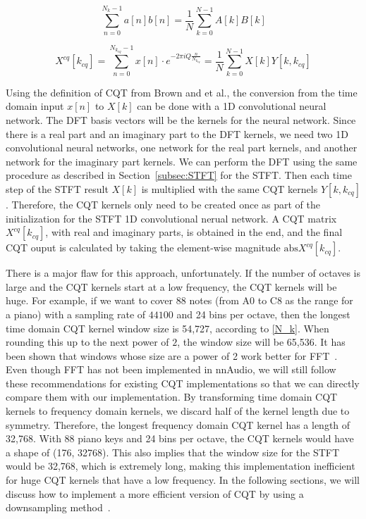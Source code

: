 \documentclass{ieeeaccess}
\begin{document}
\begin{equation}
    \sum_{n=0}^{N_k-1}a[n]b[n] = \frac{1}{N}\sum_{k=0}^{N-1}A[k]B[k]
    \label{Parseval}
\end{equation}

\begin{equation}
    X^{cq}[k_{cq}]= \sum_{n=0}^{N_{k_{cq}}-1}x[n]\cdot e^{-2\pi i Q \frac{n}{N_{k_{cq}}}} = \frac{1}{N}\sum_{k=0}^{N-1}X[k]Y[k, k_{cq}]
    \label{CQT1992}
\end{equation}




Using the definition of CQT from Brown and et al., the conversion from the time domain input $x[n]$ to $X[k]$ can be done with a 1D convolutional neural network. The DFT basis vectors will be the kernels for the neural network. Since there is a real part and an imaginary part to the DFT kernels, we need two 1D convolutional neural networks, one network for the real part kernels, and another network for the imaginary part kernels. We can perform the DFT using the same procedure as described in Section~\ref{subsec:STFT} for the STFT. Then each time step of the STFT result $X[k]$ is multiplied with the same CQT kernels $Y[k, k_{cq}]$. Therefore, the CQT kernels only need to be created once as part of the initialization for the STFT 1D convolutional nerual network. A CQT matrix $X^{cq}[k_{cq}]$, with real and imaginary parts, is obtained in the end, and the final CQT ouput is calculated by taking the element-wise magnitude $\text{abs}{X^{cq}[k_{cq}]}$.


There is a major flaw for this approach, unfortunately. If the number of octaves is large and the CQT kernels start at a low frequency, the CQT kernels will be huge. For example, if we want to cover 88 notes (from A0 to C8 as the range for a piano) with a sampling rate of $44100$ and 24 bins per octave, then the longest time domain CQT kernel window size is 54,727, according to \eqref{N_k}. When rounding this up to the next power of $2$, the window size will be 65,536. It has been shown that windows whose size are a power of 2 work better for FFT~\cite{rabiner1969chirp}.  Even though FFT has not been implemented in nnAudio, we will still follow these recommendations for existing CQT implementations so that we can directly compare them with our implementation. By transforming time domain CQT kernels to frequency domain kernels, we discard half of the kernel length due to symmetry. Therefore, the longest frequency domain CQT kernel has a length of 32,768. With 88 piano keys and 24 bins per octave, the CQT kernels would have a shape of (176, 32768). This also implies that the window size for the STFT would be 32,768, which is extremely long, making this implementation inefficient for huge CQT kernels that have a low frequency. In the following sections, we will discuss how to implement a more efficient version of CQT by using a downsampling method~\cite{brown1991calculation}.
\end{document}
